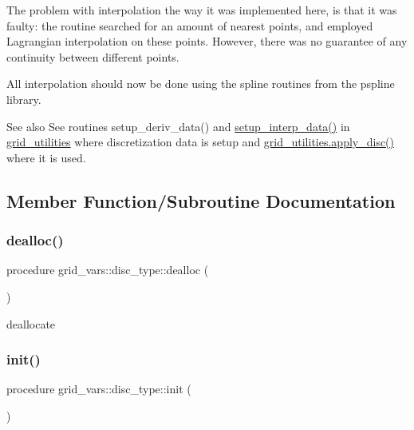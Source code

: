 The problem with interpolation the way it was implemented here, is that it was faulty\+: the routine searched for an amount of nearest points, and employed Lagrangian interpolation on these points. However, there was no guarantee of any continuity between different points.

All interpolation should now be done using the spline routines from the pspline library.

\begin{DoxySeeAlso}{See also}
See routines setup\+\_\+deriv\+\_\+data() and \hyperlink{namespacegrid__utilities_ad059876fabae2c8445e5d3971ba28742}{setup\+\_\+interp\+\_\+data()} in \hyperlink{namespacegrid__utilities}{grid\+\_\+utilities} where discretization data is setup and \hyperlink{interfacegrid__utilities_1_1apply__disc}{grid\+\_\+utilities.\+apply\+\_\+disc()} where it is used. 
\end{DoxySeeAlso}


\subsection{Member Function/\+Subroutine Documentation}
\mbox{\label{structgrid__vars_1_1disc__type_afac4991125df4659876e58eb66ee3b10}} 
\subsubsection{\texorpdfstring{dealloc()}{dealloc()}}
{\footnotesize\ttfamily procedure grid\+\_\+vars\+::disc\+\_\+type\+::dealloc (\begin{DoxyParamCaption}{ }\end{DoxyParamCaption})}



deallocate 

\mbox{\label{structgrid__vars_1_1disc__type_ac6705a79ae1e5b6e8b5c9b7c34dfd7d6}} 
\subsubsection{\texorpdfstring{init()}{init()}}
{\footnotesize\ttfamily procedure grid\+\_\+vars\+::disc\+\_\+type\+::init (\begin{DoxyParamCaption}{ }\end{DoxyParamCaption})}



